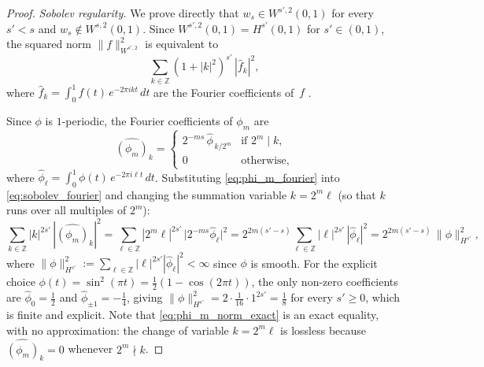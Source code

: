 \documentclass[12pt,a4paper]{article}
\theoremstyle{plain}
\theoremstyle{definition}
\theoremstyle{remark}
\begin{document}
\begin{proof}
\textit{Sobolev regularity.}
We prove directly that $w_s \in W^{s',2}(0,1)$ for every $s'<s$
and $w_s\notin W^{s,2}(0,1)$.
Since $W^{s',2}(0,1) = H^{s'}(0,1)$ for $s'\in(0,1)$, the squared
norm $\|f\|^2_{W^{s',2}}$ is equivalent to
\begin{equation}
  \sum_{k\in\mathbb{Z}} (1+|k|^2)^{s'}\,|\hat{f}_k|^2,
  \label{eq:sobolev_fourier}
\end{equation}
where $\hat{f}_k = \int_0^1 f(t)\,e^{-2\pi i k t}\,dt$ are the Fourier
coefficients of~$f$ \cite[§2.5]{Triebel1983}.

Since $\phi$ is $1$-periodic, the Fourier coefficients of $\phi_m$ are
\begin{equation}
  \widehat{(\phi_m)}_k
  = \begin{cases}
      2^{-ms}\,\hat\phi_{\,k/2^m} & \text{if } 2^m \mid k, \\
      0 & \text{otherwise,}
    \end{cases}
  \label{eq:phi_m_fourier}
\end{equation}
where $\hat\phi_\ell = \int_0^1\phi(t)\,e^{-2\pi i\ell t}\,dt$.
Substituting \eqref{eq:phi_m_fourier} into \eqref{eq:sobolev_fourier}
and changing the summation variable $k = 2^m\ell$
(so that $k$ runs over all multiples of $2^m$):
\begin{equation}
  \sum_{k\in\mathbb{Z}} |k|^{2s'}\,|\widehat{(\phi_m)}_k|^2
  = \sum_{\ell\in\mathbb{Z}} |2^m\ell|^{2s'}\,
    \bigl|2^{-ms}\hat\phi_\ell\bigr|^2
  = 2^{2m(s'-s)}\sum_{\ell\in\mathbb{Z}}|\ell|^{2s'}\,|\hat\phi_\ell|^2
  = 2^{2m(s'-s)}\,\|\phi\|^2_{H^{s'}},
  \label{eq:phi_m_norm_exact}
\end{equation}
where $\|\phi\|^2_{H^{s'}} := \sum_{\ell\in\mathbb{Z}}|\ell|^{2s'}
|\hat\phi_\ell|^2 < \infty$ since $\phi$ is smooth.
For the explicit choice $\phi(t)=\sin^2(\pi t)=\tfrac{1}{2}(1-\cos(2\pi t))$,
the only non-zero coefficients are $\hat\phi_0 = \tfrac{1}{2}$ and
$\hat\phi_{\pm 1} = -\tfrac{1}{4}$,
giving $\|\phi\|^2_{H^{s'}} = 2\cdot\tfrac{1}{16}\cdot 1^{2s'} = \tfrac{1}{8}$
for every $s' \geq 0$, which is finite and explicit.
Note that \eqref{eq:phi_m_norm_exact} is an exact equality, with
no approximation: the change of variable $k=2^m\ell$ is lossless
because $\widehat{(\phi_m)}_k = 0$ whenever $2^m \nmid k$.


\end{proof}
\end{document}
